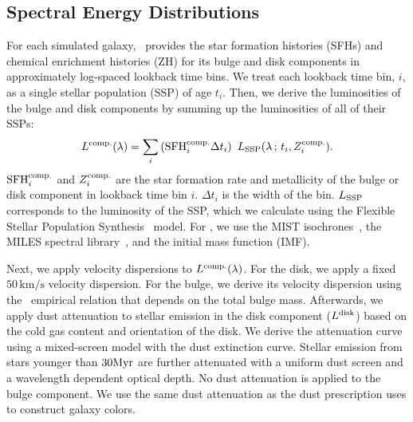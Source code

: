 
\subsection{Spectral Energy Distributions} \label{sec:sed}
For each simulated galaxy, \lgal~provides the star formation histories (SFHs)
and chemical enrichment histories (ZH) for its bulge and disk components in 
approximately log-spaced lookback time bins. %
We treat each lookback time bin, $i$, as a single stellar population (SSP) of
age $t_i$.
Then, we derive the luminosities of the bulge and disk components by summing up
the luminosities of all of their SSPs:
\begin{equation}
    L^{\rm comp.}(\lambda) = \sum \limits_i \left({\rm SFH}^{\rm comp.}_i
    \Delta t_i\right)~L_{\rm SSP}(\lambda\,;\, t_i, Z^{\rm comp.}_i). 
\end{equation}
${\rm SFH}^{\rm comp.}_i$ and $Z^{\rm comp.}_i$ are the star formation rate and
metallicity of the bulge or disk component in lookback time bin $i$. 
$\Delta t_i$ is the width of the bin. 
$L_{\rm SSP}$ corresponds to the luminosity of the SSP, which we calculate
using the Flexible Stellar Population Synthesis~\citep[\fsps;][]{conroy2009,
conroy2010c} model.
For \fsps, we use the MIST isochrones~\citep{paxton2011, paxton2013, paxton2015,
choi2016, dotter2016}, the MILES spectral library~\citep{sanchez-blazquez2006},
and the \cite{chabrier2003} initial mass function (IMF). 

Next, we apply velocity dispersions to $L^{\rm comp.}(\lambda)$.
For the disk, we apply a fixed $50\,\mathrm{km/s}$ velocity dispersion. 
For the bulge, we derive its velocity dispersion using the~\cite{zahid2016}
empirical relation that depends on the total bulge mass.
Afterwards, we apply dust attenuation to stellar emission in the disk component
($L^{\rm disk}$) based on the cold gas content and orientation of the disk. 
We derive the attenuation curve using a mixed-screen model with the
\cite{mathis1983} dust extinction curve. 
Stellar emission from stars younger than $30{\rm Myr}$ are further attenuated
with a uniform dust screen and a wavelength dependent optical depth.
No dust attenuation is applied to the bulge component.
We use the same dust attenuation as the dust prescription \cite{henriques2015}
uses to construct galaxy colors. 

